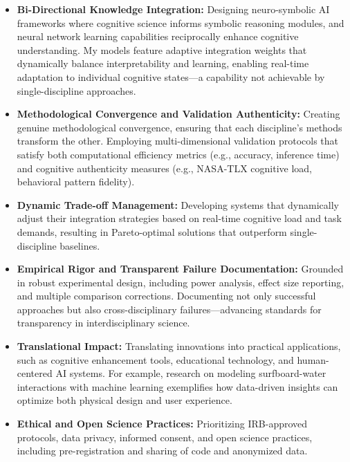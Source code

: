 \documentclass[11pt,a4paper,sans]{moderncv}
\begin{document}
\begin{itemize}
  \item \textbf{Bi-Directional Knowledge Integration:} Designing neuro-symbolic AI frameworks where cognitive science informs symbolic reasoning modules, and neural network learning capabilities reciprocally enhance cognitive understanding. My models feature adaptive integration weights that dynamically balance interpretability and learning, enabling real-time adaptation to individual cognitive states---a capability not achievable by single-discipline approaches.
  \item \textbf{Methodological Convergence and Validation Authenticity:} Creating genuine methodological convergence, ensuring that each discipline's methods transform the other. Employing multi-dimensional validation protocols that satisfy both computational efficiency metrics (e.g., accuracy, inference time) and cognitive authenticity measures (e.g., NASA-TLX cognitive load, behavioral pattern fidelity).
  \item \textbf{Dynamic Trade-off Management:} Developing systems that dynamically adjust their integration strategies based on real-time cognitive load and task demands, resulting in Pareto-optimal solutions that outperform single-discipline baselines.
  \item \textbf{Empirical Rigor and Transparent Failure Documentation:} Grounded in robust experimental design, including power analysis, effect size reporting, and multiple comparison corrections. Documenting not only successful approaches but also cross-disciplinary failures---advancing standards for transparency in interdisciplinary science.
  \item \textbf{Translational Impact:} Translating innovations into practical applications, such as cognitive enhancement tools, educational technology, and human-centered AI systems. For example, research on modeling surfboard-water interactions with machine learning exemplifies how data-driven insights can optimize both physical design and user experience.
  \item \textbf{Ethical and Open Science Practices:} Prioritizing IRB-approved protocols, data privacy, informed consent, and open science practices, including pre-registration and sharing of code and anonymized data.
\end{itemize}
\end{document}

